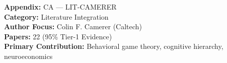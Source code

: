%
%

%
%
%
%
%

\begin{tcolorbox}[colback=gray!5!white, colframe=gray!75!black,
    title=Appendix Metadata]
\textbf{Appendix:} CA --- LIT-CAMERER \\
\textbf{Category:} Literature Integration \\
\textbf{Author Focus:} Colin F. Camerer (Caltech) \\
\textbf{Papers:} 22 (95\% Tier-1 Evidence) \\
\textbf{Primary Contribution:} Behavioral game theory, cognitive hierarchy, neuroeconomics
\end{tcolorbox}

